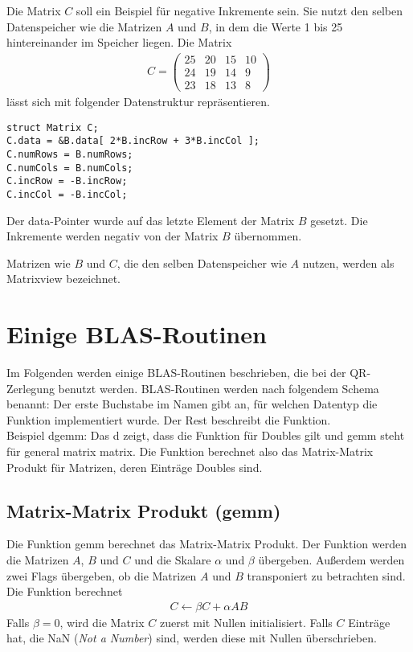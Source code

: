 Die Matrix $C$ soll ein Beispiel für negative Inkremente sein. Sie nutzt den selben Datenspeicher wie die Matrizen $A$ und $B$, in dem die Werte 1 bis 25 hintereinander im Speicher liegen.
Die Matrix 
\begin{align*}
C = \begin{pmatrix}
25 &  20 &  15 & 10 \\
24 &  19 &  14 & 9 \\
23 &  18 &  13 & 8 
\end{pmatrix}
\end{align*}
lässt sich mit folgender Datenstruktur repräsentieren.
\begin{lstlisting}
struct Matrix C;
C.data = &B.data[ 2*B.incRow + 3*B.incCol ];
C.numRows = B.numRows; 
C.numCols = B.numCols;
C.incRow = -B.incRow;
C.incCol = -B.incCol;
\end{lstlisting}
Der data-Pointer wurde auf das letzte Element der Matrix $B$ gesetzt. Die Inkremente werden negativ von der Matrix $B$ übernommen.

Matrizen wie $B$ und $C$, die den selben Datenspeicher wie $A$ nutzen, werden als Matrixview bezeichnet. \cite{blast}


\newpage
\section{Einige BLAS-Routinen}
Im Folgenden werden einige BLAS-Routinen beschrieben, die bei der QR-Zerlegung benutzt werden.
BLAS-Routinen werden nach folgendem Schema benannt:
Der erste Buchstabe im Namen gibt an, für welchen Datentyp die Funktion implementiert wurde. Der Rest beschreibt die Funktion.\\
Beispiel \glqq dgemm\grqq{}: Das \glqq d\grqq{} zeigt, dass die Funktion für Doubles gilt und  \glqq gemm\grqq{} steht für \glqq general matrix matrix\grqq{}. Die  Funktion berechnet also das Matrix-Matrix Produkt für Matrizen, deren Einträge Doubles sind.

\subsection{Matrix-Matrix Produkt (gemm)}
Die Funktion \glqq gemm\grqq{} berechnet das Matrix-Matrix Produkt.
Der Funktion werden die Matrizen $A$, $B$ und $C$ und die Skalare $\alpha$ und $\beta$ übergeben. Außerdem werden zwei Flags übergeben, ob die Matrizen $A$ und $B$ transponiert zu betrachten sind.\\
Die Funktion berechnet
\begin{align}
	C \leftarrow \beta  C + \alpha  A  B
\end{align}
Falls $\beta = 0$, wird die Matrix $C$ zuerst mit Nullen initialisiert. Falls $C$ Einträge hat, die NaN (\textit{Not a Number}) sind, werden diese mit Nullen überschrieben.

